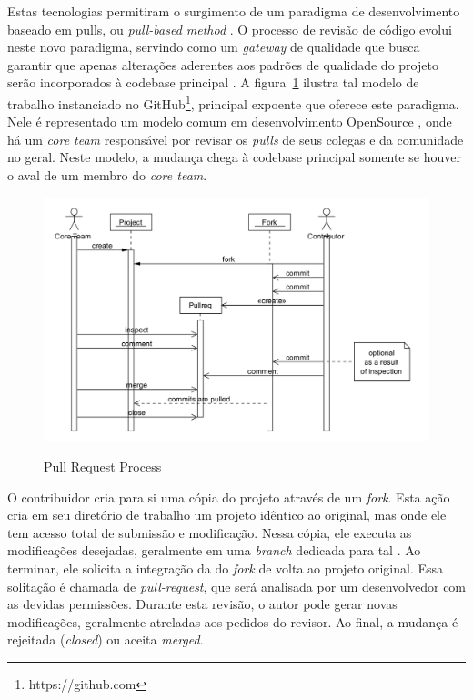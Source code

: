 \documentclass[
        12pt,
        openany, %
        oneside, %
        a4paper,
        english,
        brazil			        %
        ]{abntbibufjf}
\begin{document}
    Estas tecnologias permitiram o surgimento de um paradigma de desenvolvimento baseado em pulls, ou \textit{pull-based method} \cite{gousios2014}. O processo de revisão de código evolui neste novo paradigma, servindo como um \textit{gateway} de qualidade que busca garantir que apenas alterações aderentes aos padrões de qualidade do projeto serão incorporados à codebase principal \cite{gousios2015}. A figura~\ref{fig:pull-request-flow} ilustra tal modelo de trabalho instanciado no GitHub\footnote{https://github.com}, principal expoente que oferece este paradigma. Nele é representado um modelo comum em desenvolvimento OpenSource \cite{6385140}, onde há um \textit{core team} responsável por revisar os \textit{pulls} de seus colegas e da comunidade no geral. Neste modelo, a mudança chega à codebase principal somente se houver o aval de um membro do \textit{core team}.

     \begin{figure}[!htbp]
      \includegraphics[width=\textwidth]{pull-request-flow}\label{fig:pull-request-flow}
      \caption{Pull Request Process \cite{gousios2014}}
    \end{figure}

    O contribuidor cria para si uma cópia do projeto através de um \textit{fork}. Esta ação cria em seu diretório de trabalho um projeto idêntico ao original, mas onde ele tem acesso total de submissão e modificação. Nessa cópia, ele executa as modificações desejadas, geralmente em uma \textit{branch} dedicada para tal \cite{gousios2016}. Ao terminar, ele solicita a integração da  do \textit{fork} de volta ao projeto original. Essa solitação é chamada de \textit{pull-request}, que será analisada por um desenvolvedor com as devidas permissões. Durante esta revisão, o autor pode gerar novas modificações, geralmente atreladas aos pedidos do revisor. Ao final, a mudança é rejeitada (\textit{closed}) ou aceita \textit{merged}.
\end{document}
